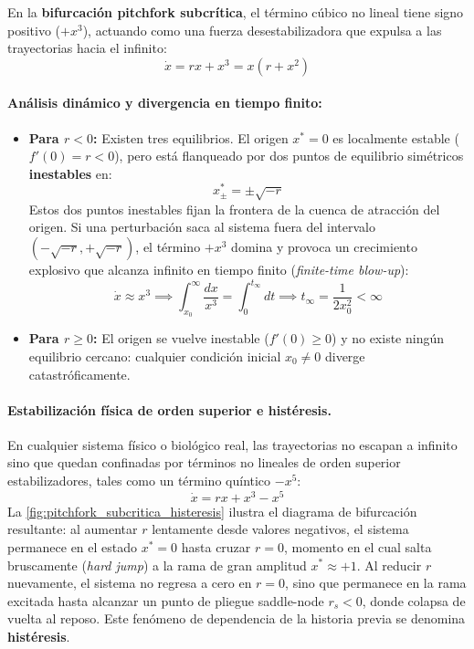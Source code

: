En la \textbf{bifurcación pitchfork subcrítica}, el término cúbico no lineal tiene signo positivo ($+x^3$), actuando como una fuerza desestabilizadora que expulsa a las trayectorias hacia el infinito:
\begin{equation}
    \dot{x} = rx + x^3 = x(r + x^2)
    \label{eq:pitchfork_subcritica}
\end{equation}

\paragraph{Análisis dinámico y divergencia en tiempo finito:}
\begin{itemize}
    \item \textbf{Para $r < 0$:} Existen tres equilibrios. El origen $x^* = 0$ es localmente estable ($f'(0) = r < 0$), pero está flanqueado por dos puntos de equilibrio simétricos \textbf{inestables} en:
    \begin{equation}
        x_\pm^* = \pm\sqrt{-r}
    \end{equation}
    Estos dos puntos inestables fijan la frontera de la cuenca de atracción del origen. Si una perturbación saca al sistema fuera del intervalo $(-\sqrt{-r}, +\sqrt{-r})$, el término $+x^3$ domina y provoca un crecimiento explosivo que alcanza infinito en tiempo finito (\emph{finite-time blow-up}):
    \begin{equation}
        \dot{x} \approx x^3 \implies \int_{x_0}^\infty \frac{dx}{x^3} = \int_0^{t_\infty} dt \implies t_\infty = \frac{1}{2x_0^2} < \infty
    \end{equation}
    \item \textbf{Para $r \ge 0$:} El origen se vuelve inestable ($f'(0) \ge 0$) y no existe ningún equilibrio cercano: cualquier condición inicial $x_0 \neq 0$ diverge catastróficamente.
\end{itemize}

\paragraph{Estabilización física de orden superior e histéresis.}
En cualquier sistema físico o biológico real, las trayectorias no escapan a infinito sino que quedan confinadas por términos no lineales de orden superior estabilizadores, tales como un término quíntico $-x^5$:
\begin{equation}
    \dot{x} = rx + x^3 - x^5
    \label{eq:pitchfork_subcritica_estabilizada}
\end{equation}
La \cref{fig:pitchfork_subcritica_histeresis} ilustra el diagrama de bifurcación resultante: al aumentar $r$ lentamente desde valores negativos, el sistema permanece en el estado $x^* = 0$ hasta cruzar $r = 0$, momento en el cual salta bruscamente (\emph{hard jump}) a la rama de gran amplitud $x^* \approx +1$. Al reducir $r$ nuevamente, el sistema no regresa a cero en $r=0$, sino que permanece en la rama excitada hasta alcanzar un punto de pliegue saddle-node $r_s < 0$, donde colapsa de vuelta al reposo. Este fenómeno de dependencia de la historia previa se denomina \textbf{histéresis}.

